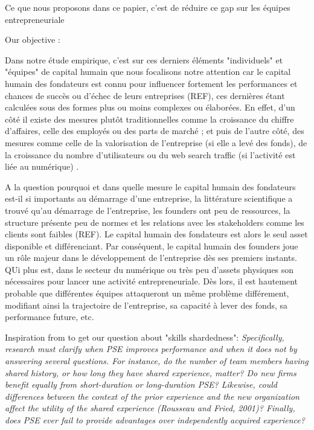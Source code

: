 \documentclass[11pt]{article}
\begin{document}
Ce que nous proposons dans ce papier, c'est de réduire ce gap sur les équipes entrepreneuriale

Our objective :

Dans notre étude empirique, c'est sur ces derniers éléments "individuels" et "équipes" de capital humain que nous focalisons notre attention car le capital humain des fondateurs  est connu pour influencer fortement les performances et chances de succès ou d'échec de leurs entreprises (REF), ces dernières étant calculées sous des formes plus ou moins complexes ou élaborées. En effet, d'un côté il existe des mesures plutôt traditionnelles comme la croissance du chiffre d'affaires, celle des employés ou des parts de marché ; et puis de l'autre côté, des mesures comme celle de la valorisation de l'entreprise (si elle a levé des fonds), de la croissance du nombre d'utilisateurs ou du web search traffic (si l'activité est liée au numérique) \citep{malyy2021value}.

A la question pourquoi et dans quelle mesure le capital humain des fondateurs est-il si importants au démarrage d'une entreprise, la littérature scientifique a trouvé qu'au démarrage de l'entreprise, les founders ont peu de ressources, la structure présente peu de normes et les relations avec les stakeholders comme les clients sont faibles (REF). Le capital humain des fondateurs est alors le seul asset disponible et différenciant. Par conséquent, le capital humain des founders joue un rôle majeur dans le développement de l'entreprise dès ses premiers instants. QUi plus est, dans le secteur du numérique ou très peu d'assets physiques son nécessaires pour lancer une activité entrepreneuriale. Dès lors, il est hautement probable que différentes équipes attaqueront un même problème différement, modifiant ainsi la trajectoire de l'entreprise, sa capacité à lever des fonds, sa performance future, etc.

Inspiration from \citep{zheng2016shared} to get our question about "skills shardedness": \textit{Specifically, research must clarify when PSE improves performance and when it does not by answering several questions. For instance, do the number of team members having shared history, or how long they have shared experience, matter? Do new firms benefit equally from short-duration or long-duration PSE? Likewise, could differences between the context of the prior experience and the new organization affect the utility of the shared experience (Rousseau and Fried, 2001)? Finally, does PSE ever fail to provide advantages over independently acquired experience?}
\end{document}
